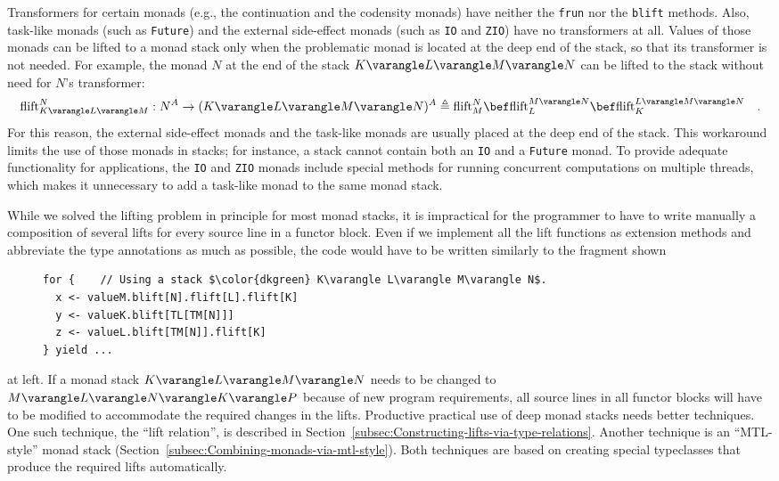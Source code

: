 Transformers for certain monads (e.g., the continuation and the codensity
monads) have neither the \lstinline!frun! nor the \lstinline!blift!
methods. Also, task-like monads (such as \lstinline!Future!) and
the external side-effect monads (such as \lstinline!IO! and \lstinline!ZIO!)
have no transformers at all. Values of those monads can be lifted
to a monad stack only when the problematic monad is located at the
deep end of the stack, so that its transformer is not needed. For
example, the monad $N$ at the end of the stack $K\varangle L\varangle M\varangle N$
can be lifted to the stack without need for $N$\textsf{'}s transformer:
\[
\text{flift}_{K\varangle L\varangle M}^{N}:N^{A}\rightarrow(K\varangle L\varangle M\varangle N)^{A}\triangleq\text{flift}_{M}^{N}\bef\text{flift}_{L}^{M\varangle N}\bef\text{flift}_{K}^{L\varangle M\varangle N}\quad.
\]
For this reason, the external side-effect monads and the task-like
monads are usually placed at the deep end of the stack. This workaround
limits the use of those monads in stacks; for instance, a stack cannot
contain both an \lstinline!IO! and a \lstinline!Future! monad. To
provide adequate functionality for applications, the \lstinline!IO!
and \lstinline!ZIO! monads include special methods for running concurrent
computations on multiple threads, which makes it unnecessary to add
a task-like monad to the same monad stack.

While we solved the lifting problem in principle for most monad stacks,
it is impractical for the programmer to have to write manually a composition
of several lifts for every source line in a functor block. Even if
we implement all the lift functions as extension methods and abbreviate
the type annotations as much as possible, the code would have to be
written similarly to the fragment shown

\begin{wrapfigure}{l}{0.408\columnwidth}%
\vspace{-0.9\baselineskip}
\begin{lstlisting}[mathescape=true]
for {    // Using a stack $\color{dkgreen} K\varangle L\varangle M\varangle N$.
  x <- valueM.blift[N].flift[L].flift[K]
  y <- valueK.blift[TL[TM[N]]]
  z <- valueL.blift[TM[N]].flift[K]
} yield ...
\end{lstlisting}
\vspace{-1.25\baselineskip}
\end{wrapfigure}%

\noindent at left. If a monad stack $K\varangle L\varangle M\varangle N$
needs to be changed to $M\varangle L\varangle N\varangle K\varangle P$
because of new program requirements, all source lines in all functor
blocks will have to be modified to accommodate the required changes
in the lifts. Productive practical use of deep monad stacks needs
better techniques. One such technique, the \textsf{``}lift relation\textsf{''}, is
described in Section~\ref{subsec:Constructing-lifts-via-type-relations}.
Another technique is an \textsf{``}MTL-style\textsf{''} monad stack (Section~\ref{subsec:Combining-monads-via-mtl-style}).
Both techniques are based on creating special typeclasses that produce
the required lifts automatically.

